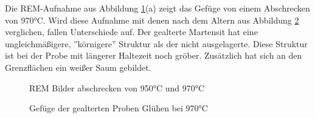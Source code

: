 \documentclass[a4paper, 11pt]{tubsreprt}
\begin{document}
Die REM-Aufnahme aus Abbildung \ref{REM 970C und 950C}(a) zeigt das Gefüge von einem Abschrecken von 970°C. Wird diese Aufnahme mit denen nach dem Altern aus Abbildung \ref{REM 970C auslagerung} verglichen, fallen Unterschiede auf. Der gealterte Martensit hat eine ungleichmäßigere, ''körnigere''  Struktur als der nicht ausgelagerte. Diese Struktur ist bei der Probe mit längerer Haltezeit noch gröber. Zusätzlich hat sich an den Grenzflächen ein weißer Saum gebildet.
\begin{figure}
\caption{REM Bilder abschrecken von 950°C und 970°C}
\label{REM 970C und 950C}
\end{figure}


\begin{figure}
\caption{Gefüge der gealterten Proben Glühen bei 970°C}
\label{REM 970C auslagerung}
\end{figure}
\end{document}
